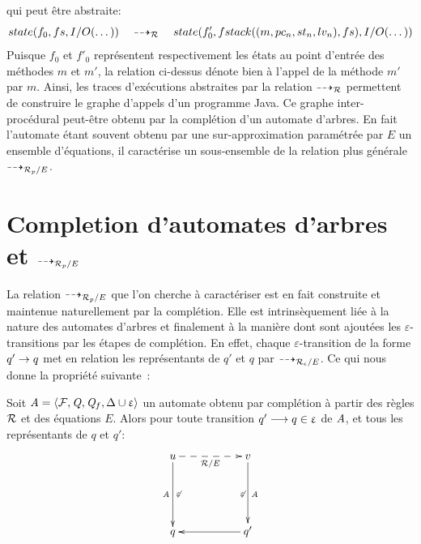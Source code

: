 \noindent qui peut être abstraite:
\[ state(f_0, fs, I/O(\dots)) \quad \dashrightarrow_\mathcal R \quad state(f'_0, fstack((m, pc_n, st_n, lv_n), fs), I/O(\dots)) \]
Puisque $f_0$ et $f'_0$ représentent respectivement les états au point d'entrée des méthodes $m$ et $m'$, la relation ci-dessus
dénote bien à l'appel de la méthode $m'$ par $m$. Ainsi, les traces d'exécutions abstraites par la relation $\dashrightarrow_\mathcal R$
permettent de construire le graphe d'appels d'un programme Java.
Ce graphe inter-procédural peut-être obtenu par la complétion d'un automate d'arbres.
En fait l'automate étant souvent obtenu par une sur-approximation paramétrée par $E$ un ensemble d'équations, il caractérise 
un sous-ensemble de la relation plus générale $\dashrightarrow_{\mathcal R_p/E}$. 

\section{Completion d'automates d'arbres et $\dashrightarrow_{\mathcal R_p/E}$}

La relation $\dashrightarrow_{\mathcal R_p/E}$ que l'on cherche à caractériser est en fait construite
et maintenue naturellement par la complétion. Elle est intrinsèquement liée à la nature
des automates d'arbres et finalement à la manière dont sont ajoutées les  $\varepsilon$-transitions 
par les étapes de complétion. En effet, chaque $\varepsilon$-transition de la forme $q' \rightarrow q$
met en relation les représentants de $q'$ et $q$ par $\dashrightarrow_{\mathcal R_\epsilon/E}$.
Ce qui nous donne la propriété suivante~:

\begin{lemma}
  \label{lem:completion_arw}
  Soit $\mathit A = \langle \mathcal{F}, \mathit Q, \mathit Q_f, \Delta \cup \upvarepsilon\rangle$ un automate obtenu 
  par complétion à partir des règles $\mathcal R$ et des équations $E$.
  Alors pour toute transition $q' \longrightarrow q \in \upvarepsilon$ de $\mathit A$,
  et tous les représentants de $q$ et $q'$:
  \[
  \xymatrix{
    u \ar[dd]_{\A}^{\not\varepsilon} \ar@{-->} [rr]_{\R/E} && v \ar[dd]^{\A}_{\not\varepsilon}\\
    &&\\
    q && q' \ar[ll]
  }
  \]
  
  \end{lemma}

